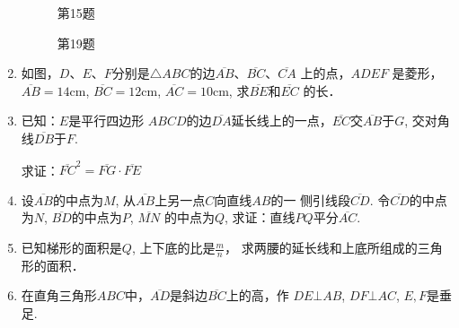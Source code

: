 \begin{enumerate}
\begin{figure}[htp]\centering
    \begin{minipage}[t]{0.48\textwidth}
    \centering
{}
    \caption*{第15题}
    \end{minipage}
    \begin{minipage}[t]{0.48\textwidth}
    \centering
    \caption*{第19题}
    \end{minipage}
    \end{figure}

\item 如图，$D$、$E$、$F$分别是$\triangle ABC$的边$\overline{AB}$、$\overline{BC}$、$\overline{CA}$
上的点，$ADEF$
是菱形，$\overline{AB}=14$cm, $\overline{BC}=12$cm, $\overline{AC}=10$cm, 求$\overline{BE}$和$\overline{EC}$
的长．

\item 已知：$E$是平行四边形
$ABCD$的边$\overline{DA}$延长线上的一点，$\overline{EC}$交$\overline{AB}$于$G$, 交对角线$\overline{DB}$于$F$.

求证：$\overline{FC}^2=\overline{FG}\cdot \overline{FE}$
\item 设$\overline{AB}$的中点为$M$, 从$\overline{AB}$上另一点$C$向直线$AB$的一
侧引线段$\overline{CD}$. 令$\overline{CD}$的中点为$N$, $\overline{BD}$的中点为$P$, $\overline{MN}$
的中点为$Q$, 求证：直线$PQ$平分$\overline{AC}$.
\item 已知梯形的面积是$Q$, 上下底的比是$\frac{m}{n}$，
求两腰的延长线和上底所组成的三角形的面积．
\item 在直角三角形$ABC$中，$\overline{AD}$是斜边$\overline{BC}$上的高，作
$DE\bot AB$, $DF\bot AC$, $E,F$是垂足.


\end{enumerate}

